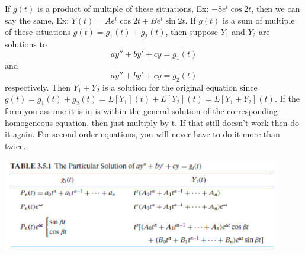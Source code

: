    \newline \indent
    If $g(t)$ is a product of multiple of these situations, Ex: $-8e^{t}\cos 2t$, then we can say the same, Ex: $Y(t) = Ae^t\cos 2t + Be^t \sin 2t$. 
    \newline \indent
    If $g(t)$ is a sum of multiple of these situations $g(t) = g_1(t) + g_2(t)$, then suppose $Y_1$ and $Y_2$ are solutions to 
    $$ay'' + by' + cy = g_1(t)$$
    and $$ay'' + by' + cy = g_2(t)$$ 
    respectively. Then $Y_1 + Y_2$ is a solution for the original equation since $g(t) = g_1(t) + g_2(t) = L[Y_1](t) + L[Y_2](t) = L[Y_1 + Y_2](t)$.
    \newline \indent
    If the form you assume it is in is within the general solution of the corresponding homogeneous equation, then just multiply by t. If that still doesn't work then do it again. For second order equations, you will never have to do it more than twice.
    \begin{center}
        \includegraphics[width=345pt]{table.png}
    \end{center}
    